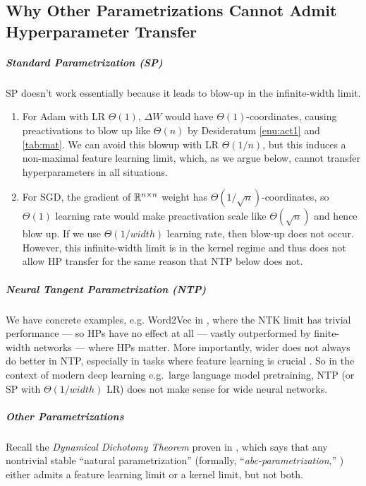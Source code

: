 \documentclass{article}
\theoremstyle{definition}
\begin{document}
    \subsection{Why Other Parametrizations Cannot Admit Hyperparameter Transfer}
    \label{sec:otherparamdontwork}
    
    \subparagraph*{Standard Parametrization (SP)}
    
    SP doesn't work essentially because it leads to blow-up in the infinite-width limit.
    \begin{enumerate}
    \item For Adam with LR $\Theta(1)$, $\Delta W$ would have $\Theta(1)$-coordinates, causing preactivations to blow up like $\Theta(n)$ by Desideratum \ref{enu:act1} and \cref{tab:mat}.
    We can avoid this blowup with LR $\Theta(1/n)$, but this induces a non-maximal feature learning limit, which, as we argue below, cannot transfer hyperparameters in all situations.
    \item For SGD, the gradient of $\mathbb{R}^{n\times n}$ weight has $\Theta(1/\sqrt{n})$-coordinates, so $\Theta(1)$ learning rate would make preactivation scale like $\Theta(\sqrt{n})$ and hence blow up.
    If we use $\Theta(1/width)$ learning rate, then blow-up does not occur.
    However, this infinite-width limit is in the kernel regime \citep{TP4} and thus does not allow HP transfer for the same reason that NTP below does not.
    
    \end{enumerate}
    
    \subparagraph*{Neural Tangent Parametrization (NTP)}
    
    We have concrete examples, e.g. Word2Vec in \citep{TP4}, where the NTK limit has trivial performance --- so HPs have no effect at all --- vastly outperformed by finite-width networks --- where HPs matter. More importantly, wider does not always do better in NTP, especially in tasks where feature learning is crucial \citep{TP4,yang2022efficient}.
    So in the context of modern deep learning e.g.\ large language model pretraining, NTP (or SP with $\Theta(1/width)$ LR) does not make sense for wide neural networks.
    
    \subparagraph*{Other Parametrizations}
    
    Recall the \emph{Dynamical Dichotomy Theorem} proven in \cite{TP4}, which says that any nontrivial stable ``natural parametrization'' (formally, ``\emph{abc-parametrization},'' \citep{TP4}) either admits a feature learning limit or a kernel limit, but not both.
    
\end{document}
